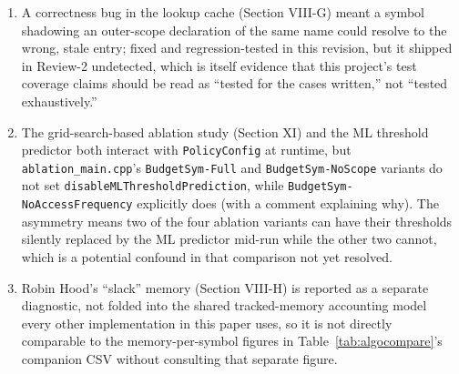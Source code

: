 \documentclass[conference]{IEEEtran}
\begin{document}
\begin{enumerate}
\item A correctness bug in the lookup cache (Section VIII-G) meant a symbol
  shadowing an outer-scope declaration of the same name could resolve to
  the wrong, stale entry; fixed and regression-tested in this revision, but
  it shipped in Review-2 undetected, which is itself evidence that this
  project's test coverage claims should be read as ``tested for the cases
  written,'' not ``tested exhaustively.''
\item The grid-search-based ablation study (Section XI) and the ML
  threshold predictor both interact with \texttt{PolicyConfig} at runtime,
  but \texttt{ablation\_main.cpp}'s \texttt{BudgetSym-Full} and
  \texttt{BudgetSym-NoScope} variants do not set
  \texttt{disableMLThresholdPrediction}, while \texttt{BudgetSym-NoAccessFrequency}
  explicitly does (with a comment explaining why). The asymmetry means two
  of the four ablation variants can have their thresholds silently replaced
  by the ML predictor mid-run while the other two cannot, which is a
  potential confound in that comparison not yet resolved.
\item Robin Hood's ``slack'' memory (Section VIII-H) is reported as a
  separate diagnostic, not folded into the shared tracked-memory
  accounting model every other implementation in this paper uses, so it is
  not directly comparable to the memory-per-symbol figures in
  Table~\ref{tab:algocompare}'s companion CSV without consulting that
  separate figure.
\end{enumerate}
\end{document}
